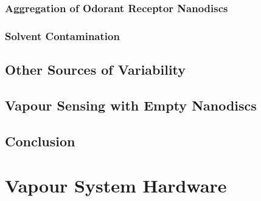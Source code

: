 \documentclass[
  a4paper,
]{scrbook}
\begin{document}
\hypertarget{aggregation-of-odorant-receptor-nanodiscs}{%
\subsection{Aggregation of Odorant Receptor
Nanodiscs}\label{aggregation-of-odorant-receptor-nanodiscs}}

\hypertarget{solvent-contamination}{%
\subsection{Solvent Contamination}\label{solvent-contamination}}

\hypertarget{other-sources-of-variability}{%
\section{Other Sources of
Variability}\label{other-sources-of-variability}}

\hypertarget{vapour-sensing-with-empty-nanodiscs}{%
\section{Vapour Sensing with Empty
Nanodiscs}\label{vapour-sensing-with-empty-nanodiscs}}

\hypertarget{conclusion-1}{%
\section{Conclusion}\label{conclusion-1}}

\cleardoublepage
{}
{}
\appendix

\hypertarget{sec-vapour-sensor-components}{%
\chapter{Vapour System Hardware}\label{sec-vapour-sensor-components}}
\end{document}
